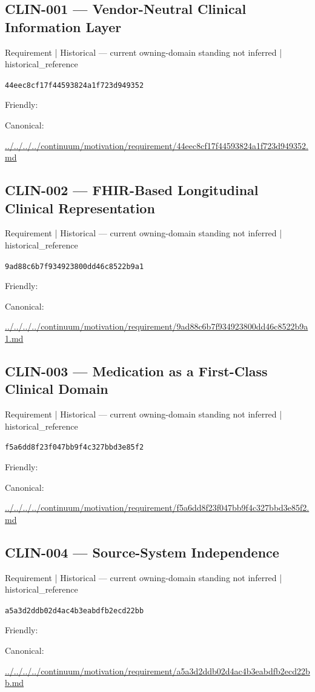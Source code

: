 \documentclass[10pt,a4paper]{article}
\begin{document}
\subsection*{CLIN-001 — Vendor-Neutral Clinical Information Layer}
{\small Requirement | Historical — current owning-domain standing not inferred | historical\_reference}\par
\texttt{44eec8cf17f44593824a1f723d949352}\par
Friendly: \par
Canonical: \par
{\footnotesize\url{../../../../continuum/motivation/requirement/44eec8cf17f44593824a1f723d949352.md}}\par
\subsection*{CLIN-002 — FHIR-Based Longitudinal Clinical Representation}
{\small Requirement | Historical — current owning-domain standing not inferred | historical\_reference}\par
\texttt{9ad88c6b7f934923800dd46c8522b9a1}\par
Friendly: \par
Canonical: \par
{\footnotesize\url{../../../../continuum/motivation/requirement/9ad88c6b7f934923800dd46c8522b9a1.md}}\par
\subsection*{CLIN-003 — Medication as a First-Class Clinical Domain}
{\small Requirement | Historical — current owning-domain standing not inferred | historical\_reference}\par
\texttt{f5a6dd8f23f047bb9f4c327bbd3e85f2}\par
Friendly: \par
Canonical: \par
{\footnotesize\url{../../../../continuum/motivation/requirement/f5a6dd8f23f047bb9f4c327bbd3e85f2.md}}\par
\subsection*{CLIN-004 — Source-System Independence}
{\small Requirement | Historical — current owning-domain standing not inferred | historical\_reference}\par
\texttt{a5a3d2ddb02d4ac4b3eabdfb2ecd22bb}\par
Friendly: \par
Canonical: \par
{\footnotesize\url{../../../../continuum/motivation/requirement/a5a3d2ddb02d4ac4b3eabdfb2ecd22bb.md}}\par
\end{document}
